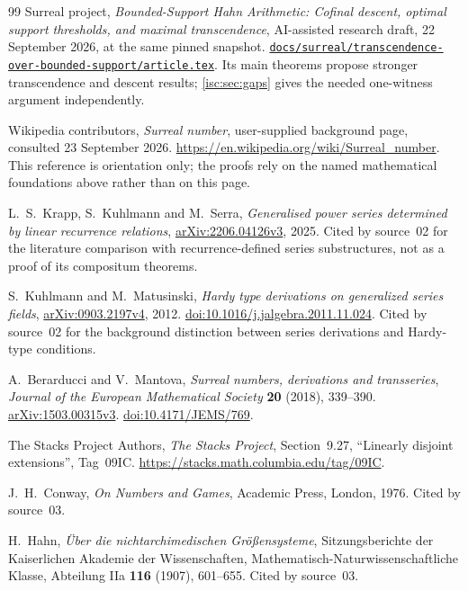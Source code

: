 \documentclass[11pt,letterpaper]{article}
\theoremstyle{definition}
\theoremstyle{remark}
\newcommand{\repo}[1]{\href{https://github.com/VladimirReshetnikov/Surreal/blob/bcac55ae6fd3f2b354e568ba1d2e94d496a2cc59/#1}{\nolinkurl{#1}}}
\numberwithin{equation}{section}
\begin{document}
\begin{thebibliography}{99}
Surreal project, \emph{Bounded-Support Hahn Arithmetic: Cofinal descent,
optimal support thresholds, and maximal transcendence}, AI-assisted
research draft, 22 September 2026, at the same pinned snapshot.
\repo{docs/surreal/transcendence-over-bounded-support/article.tex}.
Its main theorems propose stronger transcendence and descent results;
\cref{isc:sec:gaps} gives the needed one-witness argument independently.

Wikipedia contributors, \emph{Surreal number}, user-supplied background
page, consulted 23 September 2026.
\url{https://en.wikipedia.org/wiki/Surreal_number}.
This reference is orientation only; the proofs rely on the named
mathematical foundations above rather than on this page.


L.~S.~Krapp, S.~Kuhlmann and M.~Serra, \emph{Generalised power series
determined by linear recurrence relations},
\href{https://arxiv.org/abs/2206.04126v3}{arXiv:2206.04126v3}, 2025.
Cited by source~02 for the literature comparison with recurrence-defined
series substructures, not as a proof of its compositum theorems.

S.~Kuhlmann and M.~Matusinski, \emph{Hardy type derivations on generalized
series fields},
\href{https://arxiv.org/abs/0903.2197v4}{arXiv:0903.2197v4}, 2012.
\href{https://doi.org/10.1016/j.jalgebra.2011.11.024}{doi:10.1016/j.jalgebra.2011.11.024}.
Cited by source~02 for the background distinction between series
derivations and Hardy-type conditions.

A.~Berarducci and V.~Mantova, \emph{Surreal numbers, derivations and
transseries}, \emph{Journal of the European Mathematical Society}
\textbf{20} (2018), 339--390.
\href{https://arxiv.org/abs/1503.00315v3}{arXiv:1503.00315v3}.
\href{https://doi.org/10.4171/JEMS/769}{doi:10.4171/JEMS/769}.

The Stacks Project Authors, \emph{The Stacks Project}, Section~9.27,
``Linearly disjoint extensions'', Tag~09IC.
\url{https://stacks.math.columbia.edu/tag/09IC}.

J.~H.~Conway, \emph{On Numbers and Games}, Academic Press, London, 1976.
Cited by source~03.

H.~Hahn, \emph{\"Uber die nichtarchimedischen Gr\"o\ss ensysteme},
Sitzungsberichte der Kaiserlichen Akademie der Wissenschaften,
Mathematisch-Naturwissenschaftliche Klasse, Abteilung IIa
\textbf{116} (1907), 601--655. Cited by source~03.


\end{thebibliography}
\end{document}
